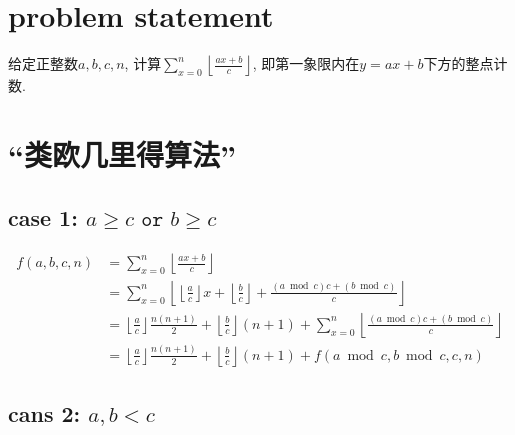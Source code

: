 \documentclass{article}
\begin{document}
\section{problem statement}

给定正整数$a,b,c,n$,
计算$\sum_{x=0}^n \left\lfloor\frac{ax+b}{c}\right\rfloor$,
即第一象限内在$y=ax+b$下方的整点计数.

\section{``类欧几里得算法''}

\subsection*{case 1: $a\geq c \texttt{ or } b\geq c$}

\[
	\begin{aligned}
		f(a,b,c,n)
			&=\sum_{x=0}^n \left\lfloor\frac{ax+b}{c}\right\rfloor\\
			&=\sum_{x=0}^n
				\left\lfloor
					\left\lfloor\frac{a}{c}\right\rfloor x + \left\lfloor\frac{b}{c}\right\rfloor +
					\frac{(a\bmod c)c+(b\bmod c)}{c}
				\right\rfloor\\
			&=\left\lfloor\frac{a}{c}\right\rfloor\frac{n(n+1)}{2} + \left\lfloor\frac{b}{c}\right\rfloor(n+1) +
				\sum_{x=0}^n
					\left\lfloor
						\frac{(a\bmod c)c+(b\bmod c)}{c}
					\right\rfloor\\
			&=\left\lfloor\frac{a}{c}\right\rfloor\frac{n(n+1)}{2} + \left\lfloor\frac{b}{c}\right\rfloor(n+1)
				+ f(a\bmod c,b\bmod c,c,n)
	\end{aligned}
\]


\subsection*{cans 2: $a,b < c$}
\end{document}
